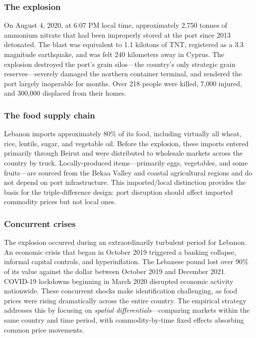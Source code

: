\documentclass[12pt]{article}
\begin{document}
\subsubsection*{The explosion} On August 4, 2020, at 6:07 PM local time, approximately 2,750 tonnes of ammonium nitrate that had been improperly stored at the port since 2013 detonated. The blast was equivalent to 1.1 kilotons of TNT, registered as a 3.3 magnitude earthquake, and was felt 240 kilometers away in Cyprus. The explosion destroyed the port's grain silos---the country's only strategic grain reserves---severely damaged the northern container terminal, and rendered the port largely inoperable for months. Over 218 people were killed, 7,000 injured, and 300,000 displaced from their homes.

\subsubsection*{The food supply chain} Lebanon imports approximately 80\% of its food, including virtually all wheat, rice, lentils, sugar, and vegetable oil. Before the explosion, these imports entered primarily through Beirut and were distributed to wholesale markets across the country by truck. Locally-produced items---primarily eggs, vegetables, and some fruits---are sourced from the Bekaa Valley and coastal agricultural regions and do not depend on port infrastructure. This imported/local distinction provides the basis for the triple-difference design: port disruption should affect imported commodity prices but not local ones.

\subsubsection*{Concurrent crises} The explosion occurred during an extraordinarily turbulent period for Lebanon. An economic crisis that began in October 2019 triggered a banking collapse, informal capital controls, and hyperinflation. The Lebanese pound lost over 90\% of its value against the dollar between October 2019 and December 2021. COVID-19 lockdowns beginning in March 2020 disrupted economic activity nationwide. These concurrent shocks make identification challenging, as food prices were rising dramatically across the entire country. The empirical strategy addresses this by focusing on \textit{spatial differentials}---comparing markets within the same country and time period, with commodity-by-time fixed effects absorbing common price movements.
\end{document}
